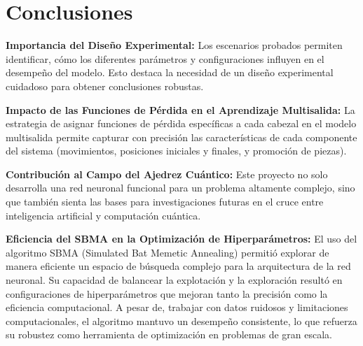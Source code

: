 \section{Conclusiones}

\textbf{Importancia del Diseño Experimental:}\newline
Los escenarios probados permiten identificar, cómo los diferentes parámetros y configuraciones influyen en el desempeño del modelo. Esto destaca la necesidad de un diseño experimental cuidadoso para obtener conclusiones robustas.\newline

\textbf{Impacto de las Funciones de Pérdida en el Aprendizaje Multisalida:}\newline
La estrategia de asignar funciones de pérdida específicas a cada cabezal en el modelo multisalida permite capturar con precisión las características de cada componente del sistema (movimientos, posiciones iniciales y finales, y promoción de piezas).\newline

\textbf{Contribución al Campo del Ajedrez Cuántico:}\newline
Este proyecto no solo desarrolla una red neuronal funcional para un problema altamente complejo, sino que también sienta las bases para investigaciones futuras en el cruce entre inteligencia artificial y computación cuántica.\newline

\textbf{Eficiencia del SBMA en la Optimización de Hiperparámetros:}\newline
El uso del algoritmo SBMA (Simulated Bat Memetic Annealing) permitió explorar de manera eficiente un espacio de búsqueda complejo para la arquitectura de la red neuronal. Su capacidad de balancear la explotación y la exploración resultó en configuraciones de hiperparámetros que mejoran tanto la precisión como la eficiencia computacional. A pesar de, trabajar con datos ruidosos y limitaciones computacionales, el algoritmo mantuvo un desempeño consistente, lo que refuerza su robustez como herramienta de optimización en problemas de gran escala.

